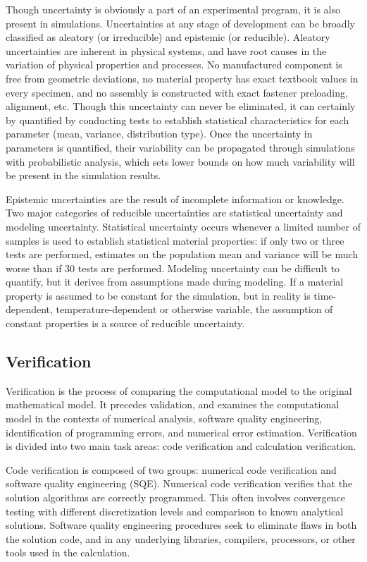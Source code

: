 Though uncertainty is obviously a part of an experimental program, it is also present in simulations.
Uncertainties at any stage of development can be broadly classified as aleatory (or irreducible) and epistemic (or reducible).
Aleatory uncertainties are inherent in physical systems, and have root causes in the variation of physical properties and processes.
No manufactured component is free from geometric deviations, no material property has exact textbook values in every specimen, and no assembly is constructed with exact fastener preloading, alignment, etc.
Though this uncertainty can never be eliminated, it can certainly by quantified by conducting tests to establish statistical characteristics for each parameter (mean, variance, distribution type).
Once the uncertainty in parameters is quantified, their variability can be propagated through simulations with probabilistic analysis, which sets lower bounds on how much variability will be present in the simulation results.

Epistemic uncertainties are the result of incomplete information or knowledge.
Two major categories of reducible uncertainties are statistical uncertainty and modeling uncertainty.
Statistical uncertainty occurs whenever a limited number of samples is used to establish statistical material properties: if only two or three tests are performed, estimates on the population mean and variance will be much worse than if 30 tests are performed.
Modeling uncertainty can be difficult to quantify, but it derives from assumptions made during modeling.
If a material property is assumed to be constant for the simulation, but in reality is time-dependent, temperature-dependent or otherwise variable, the assumption of constant properties is a source of reducible uncertainty.

\subsection{Verification}

Verification is the process of comparing the computational model to the original mathematical model.
It precedes validation, and examines the computational model in the contexts of numerical analysis, software quality engineering, identification of programming errors, and numerical error estimation.
Verification is divided into two main task areas: code verification and calculation verification.

Code verification is composed of two groups: numerical code verification and software quality engineering (SQE).
Numerical code verification verifies that the solution algorithms are correctly programmed.
This often involves convergence testing with different discretization levels and comparison to known analytical solutions.
Software quality engineering procedures seek to eliminate flaws in both the solution code, and in any underlying libraries, compilers, processors, or other tools used in the calculation.

